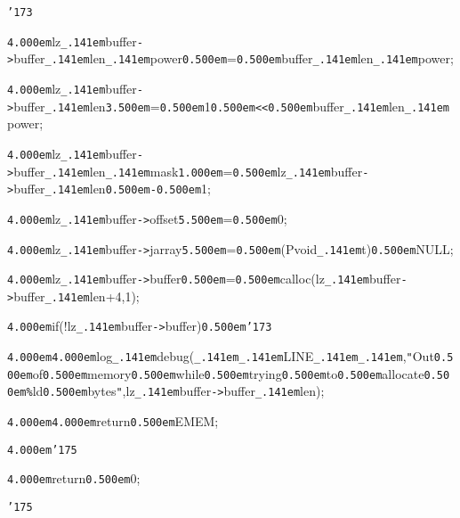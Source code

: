 \noindent
{}{\tt\char'173}

\noindent
{}{\tt\mc \kern4.000em}lz{\tt\_\kern.141em}buffer{\tt -}{\tt >}buffer{\tt\_\kern.141em}len{\tt\_\kern.141em}power{\tt\mc \kern0.500em}={\tt\mc \kern0.500em}buffer{\tt\_\kern.141em}len{\tt\_\kern.141em}power;

\noindent
{}{\tt\mc \kern4.000em}lz{\tt\_\kern.141em}buffer{\tt -}{\tt >}buffer{\tt\_\kern.141em}len{\tt\mc \kern3.500em}={\tt\mc \kern0.500em}1{\tt\mc \kern0.500em}{\tt <}{\tt <}{\tt\mc \kern0.500em}buffer{\tt\_\kern.141em}len{\tt\_\kern.141em}power;

\noindent
{}{\tt\mc \kern4.000em}lz{\tt\_\kern.141em}buffer{\tt -}{\tt >}buffer{\tt\_\kern.141em}len{\tt\_\kern.141em}mask{\tt\mc \kern1.000em}={\tt\mc \kern0.500em}lz{\tt\_\kern.141em}buffer{\tt -}{\tt >}buffer{\tt\_\kern.141em}len{\tt\mc \kern0.500em}{\tt -}{\tt\mc \kern0.500em}1;

\noindent
{}{\tt\mc \kern4.000em}lz{\tt\_\kern.141em}buffer{\tt -}{\tt >}offset{\tt\mc \kern5.500em}={\tt\mc \kern0.500em}0;

\noindent
{}{\tt\mc \kern4.000em}lz{\tt\_\kern.141em}buffer{\tt -}{\tt >}jarray{\tt\mc \kern5.500em}={\tt\mc \kern0.500em}(Pvoid{\tt\_\kern.141em}t){\tt\mc \kern0.500em}NULL;

\noindent
{}{\tt\mc \kern4.000em}lz{\tt\_\kern.141em}buffer{\tt -}{\tt >}buffer{\tt\mc \kern0.500em}={\tt\mc \kern0.500em}calloc(lz{\tt\_\kern.141em}buffer{\tt -}{\tt >}buffer{\tt\_\kern.141em}len+4,1);

\noindent
{}{\tt\mc \kern4.000em}if(!lz{\tt\_\kern.141em}buffer{\tt -}{\tt >}buffer){\tt\mc \kern0.500em}{\tt\char'173}

\noindent
{}{\tt\mc \kern4.000em}{\tt\mc \kern4.000em}log{\tt\_\kern.141em}debug({\tt\_\kern.141em}{\tt\_\kern.141em}LINE{\tt\_\kern.141em}{\tt\_\kern.141em},{\tt "}Out{\tt\mc \kern0.500em}of{\tt\mc \kern0.500em}memory{\tt\mc \kern0.500em}while{\tt\mc \kern0.500em}trying{\tt\mc \kern0.500em}to{\tt\mc \kern0.500em}allocate{\tt\mc \kern0.500em}{\tt\%}ld{\tt\mc \kern0.500em}bytes{\tt "},lz{\tt\_\kern.141em}buffer{\tt -}{\tt >}buffer{\tt\_\kern.141em}len);

\noindent
{}{\tt\mc \kern4.000em}{\tt\mc \kern4.000em}return{\tt\mc \kern0.500em}EMEM;

\noindent
{}{\tt\mc \kern4.000em}{\tt\char'175}

\noindent
{}{\tt\mc \kern4.000em}return{\tt\mc \kern0.500em}0;

\noindent
{}{\tt\char'175}

